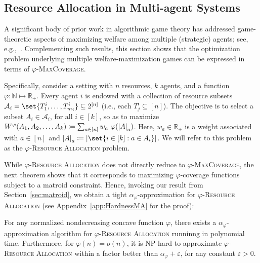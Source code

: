 \subsection{Resource Allocation in Multi-agent Systems}
\label{subsection:welfare-maximization}
A significant body of prior work in algorithmic game theory has addressed game-theoretic aspects of maximizing welfare among multiple (strategic) agents; see, e.g.,~\cite{PM19}. Complementing such results, this section shows that the optimization problem underlying multiple welfare-maximization games can be expressed in terms of $\varphi$-\textsc{MaxCoverage}. 

Specifically, consider a setting with $n$ resources, $k$ agents, and a function $\varphi: \mathbb{N} \mapsto \mathbb{R}_+$. Every agent $i$ is endowed with a collection of resource subsets $\mathcal{A}_i = \set{T^i_1, \ldots, T^i_{m_i}}  \subseteq 2^{[n]}$ (i.e., each $T^i_j \subseteq [n]$). The objective is to select a subset $A_i \in \mathcal{A}_i$, for all $i \in [k]$, so as to maximize $W^{\varphi}(A_1, A_2, \ldots, A_k)  \coloneqq \sum_{a \in [n]} w_a \ \varphi(\abs{A}_a)$. Here, $w_a \in \mathbb{R}_+$ is a weight associated with $a \in [n]$ and $\abs{A}_a \coloneqq  \abs{\set{i \in [k] : a \in A_i}}$. We will refer to this problem as the $\varphi$-\textsc{Resource Allocation} problem.

While $\varphi$-\textsc{Resource Allocation} does not directly reduce to $\varphi$-\textsc{MaxCoverage}, the next theorem shows that it corresponds to maximizing $\varphi$-coverage functions subject to a matroid constraint. Hence, invoking our result from Section~\ref{sec:matroid}, we obtain a tight $\alpha_\varphi$-approximation for $\varphi$-\textsc{Resource Allocation} (see Appendix~\ref{app:HardnessMA} for the proof):

\begin{theorem}
For any normalized nondecreasing concave function $\varphi$, there exists a $\alpha_\varphi$-approximation algorithm for $\varphi$-\textsc{Resource Allocation} runninng in polynomial time. Furthermore, for $\varphi(n) = o(n)$, it is \textrm{NP}-hard to approximate $\varphi$-\textsc{Resource Allocation} within a factor better than $\alpha_\varphi + \varepsilon$, for any constant $\varepsilon >0$.
  \label{theo:HardnessMA}
\end{theorem}


